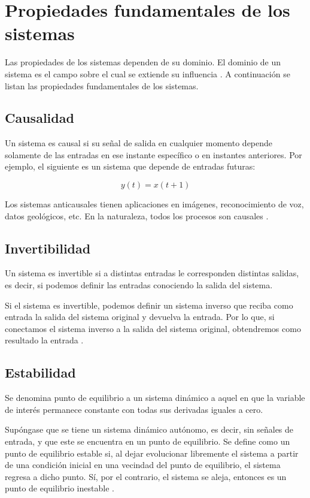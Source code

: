 \section{Propiedades fundamentales de los sistemas}

Las propiedades de los sistemas dependen de su dominio. El dominio de un sistema es el campo sobre el cual se extiende su influencia \cite{dominio}. A continuación se listan las propiedades fundamentales de los sistemas.

\subsection{Causalidad}

Un sistema es causal si su señal de salida en cualquier momento depende solamente de las entradas en ese instante específico o en instantes anteriores. Por ejemplo, el siguiente es un sistema que depende de entradas futuras:

\begin{equation*}
	y(t) = x(t + 1)
\end{equation*}

Los sistemas anticausales tienen aplicaciones en imágenes, reconocimiento de voz, datos geológicos, etc. En la naturaleza, todos los procesos son causales \cite{dinamicos}.

\subsection{Invertibilidad}

Un sistema es invertible si a distintas entradas le corresponden distintas salidas, es decir, si podemos definir las entradas conociendo la salida del sistema. 

Si el sistema es invertible, podemos definir un sistema inverso que reciba como entrada la salida del sistema original y devuelva la entrada. Por lo que, si conectamos el sistema inverso a la salida del sistema original, obtendremos como resultado la entrada \cite{dinamicos}.

\subsection{Estabilidad}

Se denomina punto de equilibrio a un sistema dinámico a aquel en que la variable de interés permanece constante con todas sus derivadas iguales a cero.

Supóngase que se tiene un sistema dinámico autónomo, es decir, sin señales de entrada, y que este se encuentra en un punto de equilibrio. Se define como un punto de equilibrio estable si, al dejar evolucionar libremente el sistema a partir de una condición inicial en una vecindad del punto de equilibrio, el sistema regresa a dicho punto. Sí, por el contrario, el sistema se aleja, entonces es un punto de equilibrio inestable \cite{dinamicos}.

